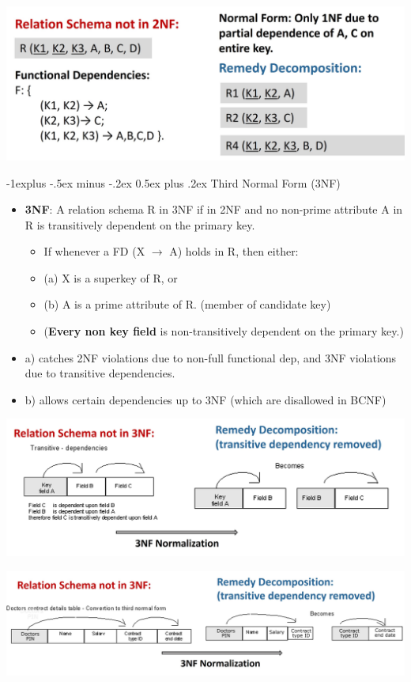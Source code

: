 \documentclass[12pt, landscape]{article}
\makeatletter
\renewcommand{\subsection}{\@startsection{subsection}{2}{0.1mm}%
                                {-1explus -.5ex minus -.2ex}%
                                {0.5ex plus .2ex}%
                                {\normalfont\normalsize\bfseries}}
\makeatother
\begin{document}
\begin{multicols*}{3}
\medskip
\centerline{\includegraphics[width = 1\linewidth]{2NF-4}}

\columnbreak	

\subsection{Third Normal Form (3NF)}
\begin{itemize}
\item \textbf{3NF}: A relation schema R in 3NF if in 2NF and
no non-prime attribute A in R is transitively dependent on the primary 
key.
\begin{itemize}
\item If whenever a FD (X $\rightarrow$ A) holds in R, then either:
\item (a) X is a superkey of R, or
\item (b) A is a prime attribute of R. (member of candidate key)
\item (\textbf{Every non key field} is non-transitively dependent on the primary key.)
\end{itemize}
\item a) catches 2NF violations due to non-full functional dep, and 3NF violations due to transitive dependencies.
\item b) allows certain dependencies up to 3NF (which are disallowed in BCNF)
\end{itemize}
\medskip
\centerline{\includegraphics[width = 1\linewidth]{3NF}}
\medskip
\centerline{\includegraphics[width = 1\linewidth]{3NF-2}}

\end{multicols*}
\end{document}
